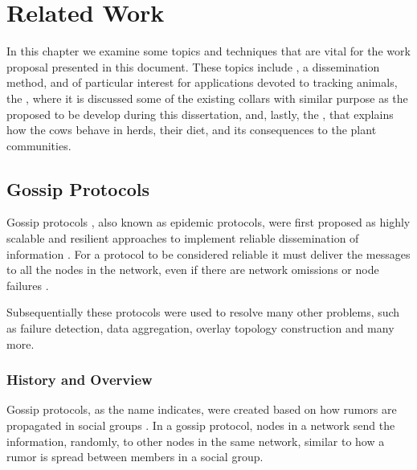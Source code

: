 
%

\chapter{Related Work}
\label{cha:related_work}
In this chapter we examine some topics and techniques that are vital for the work proposal
presented in this document. These topics include , a dissemination
method,  and of particular interest for applications
devoted to tracking animals, the ,
where it is discussed some of the existing collars with similar purpose as the proposed to be
develop during this dissertation, and, lastly, the , that explains how the cows behave in herds,
their diet, and its consequences to the plant communities.


\section{Gossip Protocols}
\label{sec:gossip_protocols}
Gossip protocols \cite{Demers1987}, also known as epidemic protocols, were first proposed as
highly scalable and resilient approaches to implement reliable dissemination of information
\cite{Bakhshi2007, Friedman2009, Kermarrec2007}. For a protocol to be considered reliable it
must deliver the messages to all the nodes in the network, even if there are network omissions
or node failures \cite{Leitao2012}.

Subsequentially these protocols were used to resolve many other problems, such as failure detection,
data aggregation, overlay topology construction and many more\cite{Montresor2017}.

\subsection{History and Overview}
\label{subsec:gossip_history_overview}
Gossip protocols, as the name indicates, were created based on how rumors are propagated in
social groups \cite{Leitao2007}. In a gossip protocol, nodes in a network send the information, randomly, to
other nodes in the same network, similar to how a rumor is spread between members in a social
group.

